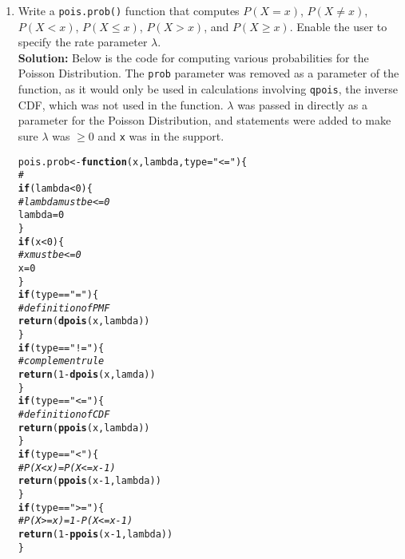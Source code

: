 \documentclass{article}\usepackage[]{graphicx}\usepackage[]{xcolor}
\makeatletter
\newcommand{\hlnum}[1]{\textcolor[rgb]{0.686,0.059,0.569}{#1}}%
\newcommand{\hlsng}[1]{\textcolor[rgb]{0.192,0.494,0.8}{#1}}%
\newcommand{\hlcom}[1]{\textcolor[rgb]{0.678,0.584,0.686}{\textit{#1}}}%
\newcommand{\hlopt}[1]{\textcolor[rgb]{0,0,0}{#1}}%
\newcommand{\hldef}[1]{\textcolor[rgb]{0.345,0.345,0.345}{#1}}%
\newcommand{\hlkwa}[1]{\textcolor[rgb]{0.161,0.373,0.58}{\textbf{#1}}}%
\newcommand{\hlkwb}[1]{\textcolor[rgb]{0.69,0.353,0.396}{#1}}%
\newcommand{\hlkwc}[1]{\textcolor[rgb]{0.333,0.667,0.333}{#1}}%
\newcommand{\hlkwd}[1]{\textcolor[rgb]{0.737,0.353,0.396}{\textbf{#1}}}%
\newenvironment{kframe}{%
 \def\at@end@of@kframe{}%
 \ifinner\ifhmode%
  \def\at@end@of@kframe{\end{minipage}}%
  \begin{minipage}{\columnwidth}%
 \fi\fi%
 \def\FrameCommand##1{\hskip\@totalleftmargin \hskip-\fboxsep
 \colorbox{shadecolor}{##1}\hskip-\fboxsep
     \hskip-\linewidth \hskip-\@totalleftmargin \hskip\columnwidth}%
 \MakeFramed {\advance\hsize-\width
   \@totalleftmargin\z@ \linewidth\hsize
   \@setminipage}}%
 {\par\unskip\endMakeFramed%
 \at@end@of@kframe}
\newenvironment{knitrout}{}{} %
\makeatother
\begin{document}
  \begin{enumerate}
    \item Write a \texttt{pois.prob()} function that computes $P(X=x)$, 
    $P(X \neq x)$, $P(X<x)$, $P(X \leq x)$, $P(X > x)$, and $P(X \geq x).$ Enable the user to specify the rate parameter $\lambda$. \\
    \textbf{Solution:} Below is the code for computing various probabilities for the Poisson Distribution. The \texttt{prob} parameter was removed as a parameter of the function, as it would only be used in calculations involving \texttt{qpois}, the inverse CDF, which was not used in the function. $\lambda$ was passed in directly as a parameter for the Poisson Distribution, and statements were added to make sure $\lambda$ was $\geq 0$ and \texttt{x} was in the support. 
\begin{knitrout}\scriptsize
{}\color{fgcolor}\begin{kframe}
\begin{alltt}
\hldef{pois.prob} \hlkwb{<-} \hlkwa{function}\hldef{(}\hlkwc{x}\hldef{,} \hlkwc{lambda}\hldef{,} \hlkwc{type}\hldef{=}\hlsng{"<="}\hldef{)\{}
  \hlcom{# }
  \hlkwa{if} \hldef{(lambda} \hlopt{<} \hlnum{0}\hldef{)\{}
    \hlcom{# lambda must be <= 0 }
    \hldef{lambda} \hlkwb{=} \hlnum{0}
  \hldef{\}}
  \hlkwa{if} \hldef{(x} \hlopt{<} \hlnum{0}\hldef{)\{}
    \hlcom{# x must be <= 0}
    \hldef{x} \hlkwb{=} \hlnum{0}
  \hldef{\}}
  \hlkwa{if} \hldef{(type} \hlopt{==} \hlsng{"="}\hldef{)\{}
    \hlcom{# definition of PMF}
    \hlkwd{return}\hldef{(}\hlkwd{dpois}\hldef{(x, lambda))}
  \hldef{\}}
  \hlkwa{if} \hldef{(type} \hlopt{==} \hlsng{"!="}\hldef{)\{}
    \hlcom{# complement rule}
    \hlkwd{return}\hldef{(}\hlnum{1}\hlopt{-}\hlkwd{dpois}\hldef{(x, lamda))}
  \hldef{\}}
  \hlkwa{if}\hldef{(type} \hlopt{==} \hlsng{"<="}\hldef{)\{}
    \hlcom{# definition of CDF}
    \hlkwd{return}\hldef{(}\hlkwd{ppois}\hldef{(x, lambda))}
  \hldef{\}}
  \hlkwa{if} \hldef{(type} \hlopt{==} \hlsng{"<"}\hldef{)\{}
    \hlcom{# P(X < x) = P(X <= x-1)}
    \hlkwd{return}\hldef{(}\hlkwd{ppois}\hldef{(x}\hlopt{-}\hlnum{1}\hldef{, lambda))}
  \hldef{\}}
  \hlkwa{if} \hldef{(type} \hlopt{==} \hlsng{">="}\hldef{)\{}
    \hlcom{# P(X >= x) = 1 - P(X <= x-1)}
    \hlkwd{return}\hldef{(}\hlnum{1}\hlopt{-}\hlkwd{ppois}\hldef{(x}\hlopt{-}\hlnum{1}\hldef{, lambda))}
  \hldef{\}}

\end{alltt}
\end{kframe}
\end{knitrout}
\end{enumerate}
\end{document}
